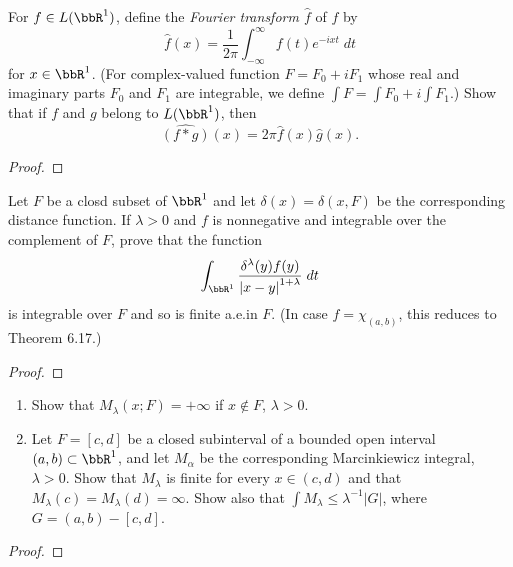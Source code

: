 \begin{problem}
For $f\in L(\bbR^1)$, define the \emph{Fourier transform $\hat f$} of $f$
by
\[
\hat f(x)=\frac{1}{2\pi}\int_{-\infty}^\infty f(t)e^{-ixt}\;dt
\]
for $x\in\bbR^1$. (For complex-valued function $F=F_0+iF_1$ whose real and
imaginary parts $F_0$ and $F_1$ are integrable, we define $\int F=\int
F_0+i\int F_1$.) Show that if $f$ and $g$ belong to $L(\bbR^1)$, then
\[
\widehat{(f*g)}(x)=2\pi\hat f(x)\hat g(x).
\]
\end{problem}
\begin{proof}
\end{proof}
\newpage

\begin{problem}
Let $F$ be a closd subset of $\bbR^1$ and let $\delta(x)=\delta(x,F)$ be
the corresponding distance function. If $\lambda>0$ and $f$ is nonnegative
and integrable over the complement of $F$, prove that the function
\[
\int_{\bbR^1}\frac{\delta^\lambda(y)f(y)}{\left|x-y\right|^{1+\lambda}}\;dt
\]
is integrable over $F$ and so is finite a.e.\@ in $F$. (In case
$f=\chi_{(a,b)}$, this reduces to Theorem 6.17.)
\end{problem}
\begin{proof}
\end{proof}
\newpage

\begin{problem}
\begin{enumerate}[label=(\alph*)]
\item Show that $M_\lambda(x;F)=+\infty$ if $x\notin F$, $\lambda>0$.
\item Let $F=[c,d]$ be a closed subinterval of a bounded open interval
  $(a,b)\subset\bbR^1$, and let $M_\alpha$ be the corresponding
  Marcinkiewicz integral, $\lambda>0$. Show that $M_\lambda$ is finite for
  every $x\in(c,d)$ and that $M_\lambda(c)=M_\lambda(d)=\infty$. Show also
  that $\int M_\lambda\leq\lambda^{-1}|G|$, where $G=(a,b)-[c,d]$.
\end{enumerate}
\end{problem}
\begin{proof}
\end{proof}


